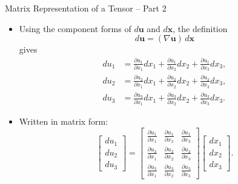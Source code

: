 \documentclass{beamer}
\begin{document}
\begin{frame}{Matrix Representation of a Tensor -- Part 2}

\begin{itemize}

\item Using the component forms of \(d\mathbf{u}\) and \(d\mathbf{x}\),
the definition
\[
d\mathbf{u} = (\nabla \mathbf{u})\, d\mathbf{x}
\]
gives
\begin{align*}
du_1 &= \frac{\partial u_1}{\partial x_1} dx_1
     + \frac{\partial u_1}{\partial x_2} dx_2
     + \frac{\partial u_1}{\partial x_3} dx_3, \\
du_2 &= \frac{\partial u_2}{\partial x_1} dx_1
     + \frac{\partial u_2}{\partial x_2} dx_2
     + \frac{\partial u_2}{\partial x_3} dx_3, \\
du_3 &= \frac{\partial u_3}{\partial x_1} dx_1
     + \frac{\partial u_3}{\partial x_2} dx_2
     + \frac{\partial u_3}{\partial x_3} dx_3.
\end{align*}

\item Written in matrix form:
\[
\begin{bmatrix}
du_1 \\ du_2 \\ du_3
\end{bmatrix}
=
\begin{bmatrix}
\frac{\partial u_1}{\partial x_1} &
\frac{\partial u_1}{\partial x_2} &
\frac{\partial u_1}{\partial x_3} \\[6pt]
\frac{\partial u_2}{\partial x_1} &
\frac{\partial u_2}{\partial x_2} &
\frac{\partial u_2}{\partial x_3} \\[6pt]
\frac{\partial u_3}{\partial x_1} &
\frac{\partial u_3}{\partial x_2} &
\frac{\partial u_3}{\partial x_3}
\end{bmatrix}
\begin{bmatrix}
dx_1 \\ dx_2 \\ dx_3
\end{bmatrix}.
\]

\end{itemize}

\end{frame}
\end{document}
